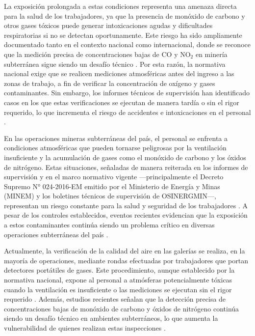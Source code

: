 La exposición prolongada a estas condiciones representa una amenaza directa para la salud de los trabajadores, ya que la presencia de monóxido de carbono y otros gases tóxicos puede generar intoxicaciones agudas y dificultades respiratorias si no se detectan oportunamente. Este riesgo ha sido ampliamente documentado tanto en el contexto nacional como internacional, donde se reconoce que la medición precisa de concentraciones bajas de CO y NO$_2$ en minería subterránea sigue siendo un desafío técnico \cite{EU_ExposureDirective_2020}. Por esta razón, la normativa nacional exige que se realicen mediciones atmosféricas antes del ingreso a las zonas de trabajo, a fin de verificar la concentración de oxígeno y gases contaminantes. Sin embargo, los informes técnicos de supervisión han identificado casos en los que estas verificaciones se ejecutan de manera tardía o sin el rigor requerido, lo que incrementa el riesgo de accidentes e intoxicaciones en el personal \cite{MINEM_Yanaquihua_2023, OSINERGMIN_BoletinGSM_2020, MINEM_DS024_2016}.




En las operaciones mineras subterráneas del país, el personal se enfrenta a condiciones atmosféricas que pueden tornarse peligrosas por la ventilación insuficiente y la acumulación de gases como el monóxido de carbono y los óxidos de nitrógeno. Estas situaciones, señaladas de manera reiterada en los informes de supervisión y en el marco normativo vigente —principalmente el Decreto Supremo N° 024-2016-EM emitido por el Ministerio de Energía y Minas (MINEM) y los boletines técnicos de supervisión de OSINERGMIN—, representan un riesgo constante para la salud y seguridad de los trabajadores \cite{OSINERGMIN_BoletinGSM_2020, MINEM_DS024_2016}. A pesar de los controles establecidos, eventos recientes evidencian que la exposición a estos contaminantes continúa siendo un problema crítico en diversas operaciones subterráneas del país \cite{MINEM_Yanaquihua_2023}.



Actualmente, la verificación de la calidad del aire en las galerías se realiza, en la mayoría de operaciones, mediante rondas efectuadas por trabajadores que portan detectores portátiles de gases. Este procedimiento, aunque establecido por la normativa nacional, expone al personal a atmósferas potencialmente tóxicas cuando la ventilación es insuficiente o las mediciones se ejecutan sin el rigor requerido \cite{MINEM_DS024_2016, OSINERGMIN_BoletinGSM_2020}. Además, estudios recientes señalan que la detección precisa de concentraciones bajas de monóxido de carbono y óxidos de nitrógeno continúa siendo un desafío técnico en ambientes subterráneos, lo que aumenta la vulnerabilidad de quienes realizan estas inspecciones \cite{EU_ExposureDirective_2020}.


